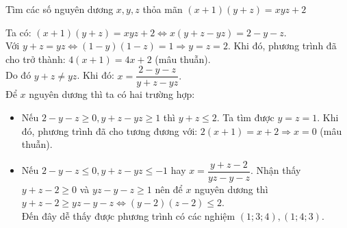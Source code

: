 \begin{ex}%
Tìm các số nguyên dương $x,y,z$ thỏa mãn $(x+1)(y+z)=xyz+2$
\loigiai
    {
Ta có: $(x+1)(y+z)=xyz+2 \Leftrightarrow x(y+z-yz)=2-y-z.$\\
Với $y+z=yz\Leftrightarrow (1-y)(1-z)=1 \Rightarrow y=z=2$. Khi đó, phương trình đã cho trở thành:
$4(x+1)=4x+2$ (mâu thuẫn).\\
Do đó $y+z\neq yz$. Khi đó: $x=\dfrac{2-y-z}{y+z-yz}.$\\
Để $x$ nguyên dương thì ta có hai trường hợp:
\begin{itemize}
  \item Nếu $2-y-z\geq0, y+z-yz\geq1$ thì $y+z\leq2$. Ta tìm được $y=z=1$. Khi đó, phương trình đã cho tương đương với: $2(x+1)=x+2\Rightarrow x=0$ (mâu thuẫn).
  \item Nếu $2-y-z\leq0,y+z-yz\leq-1$ hay $x=\dfrac{y+z-2}{yz-y-z}.$ Nhận thấy $y+z-2\geq0$ và $yz-y-z\geq1$ nên để $x$ nguyên dương thì $y+z-2\geq yz-y-z\Leftrightarrow (y-2)(z-2)\leq2$.\\
  Đến đây dễ thấy được phương trình có các nghiệm $(1;3;4),(1;4;3).$
\end{itemize}
    }
\end{ex}

